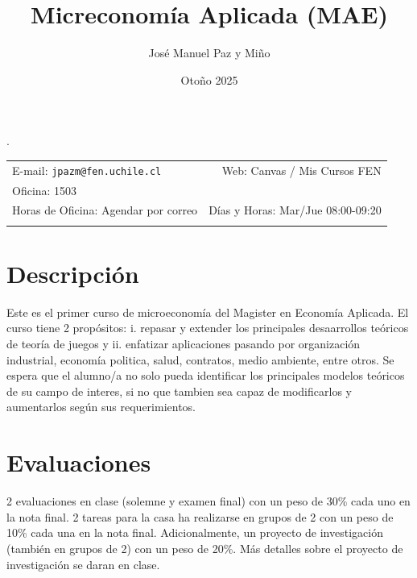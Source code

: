 \documentclass[11pt]{article}
\title{Micreconom\'ia Aplicada (MAE)}
\author{Jos\'e Manuel Paz y Mi\~no}
\date{Oto\~no 2025}
\newcommand{\blankline}{\quad\pagebreak[2]}
\begin{document}
\maketitle

\blankline

\setlength{\parindent}{0pt}.
\begin{tabular*}{.93\textwidth}{@{\extracolsep{\fill}}lr}


E-mail: \texttt{jpazm@fen.uchile.cl} & Web: Canvas / Mis Cursos FEN  \\

 Oficina: 1503 \\
 Horas de Oficina: Agendar por correo &  D\'ias y Horas: Mar/Jue 08:00-09:20 \\
 & \\
\hline
\end{tabular*}

\vspace{5 mm}


\section*{Descripci\'on}

Este es el primer curso de microeconom\'ia del Magister en Econom\'ia Aplicada. El curso tiene 2 prop\'ositos: i. repasar y extender los principales desaarrollos te\'oricos de teor\'ia de juegos y ii. enfatizar aplicaciones pasando por organizaci\'on industrial, econom\'ia politica, salud, contratos, medio ambiente, entre otros. Se espera que el alumno/a no solo pueda identificar los principales modelos te\'oricos de su campo de interes, si no que tambien sea capaz de modificarlos y aumentarlos seg\'un sus requerimientos.

\bigskip


\section*{Evaluaciones}
2 evaluaciones en clase (solemne y examen final) con un peso de 30\% cada uno en la nota final. 2 tareas para la casa ha realizarse en grupos de 2 con un peso de 10\% cada una en la nota final. Adicionalmente, un proyecto de investigaci\'on (tambi\'en en grupos de 2) con un peso de 20\%. M\'as detalles sobre el proyecto de investigaci\'on se daran en clase.
\end{document}
